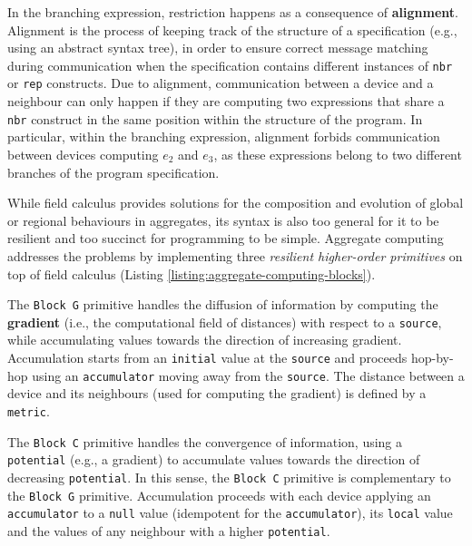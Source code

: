 \begin{itemize}
        In the branching expression, restriction happens as a consequence of
        \textbf{alignment}. Alignment is the process of keeping track of the
        structure of a specification (e.g., using an abstract syntax tree), in
        order to ensure correct message matching during communication when the
        specification contains different instances of \texttt{nbr} or
        \texttt{rep} constructs. Due to alignment, communication between a
        device and a neighbour can only happen if they are computing two
        expressions that share a \texttt{nbr} construct in the same position
        within the structure of the program. In particular, within the
        branching expression, alignment forbids communication between devices
        computing $e_2$ and $e_3$, as these expressions belong to two different
        branches of the program specification.
\end{itemize}

While field calculus provides solutions for the composition and evolution of
global or regional behaviours in aggregates, its syntax is also too general for
it to be resilient and too succinct for programming to be simple. Aggregate
computing addresses the problems by implementing three \textit{resilient
higher-order primitives} on top of field calculus (Listing
\ref{listing:aggregate-computing-blocks}).



The \texttt{Block G} primitive \cite{CAS-AggregateComputingBlocks} handles the
diffusion of information by computing the \textbf{gradient} (i.e., the
computational field of distances) with respect to a \texttt{source}, while
accumulating values towards the direction of increasing gradient. Accumulation
starts from an \texttt{initial} value at the \texttt{source} and proceeds
hop-by-hop using an \texttt{accumulator} moving away from the \texttt{source}.
The distance between a device and its neighbours (used for computing the
gradient) is defined by a \texttt{metric}.

The \texttt{Block C} primitive handles the convergence of information, using a
\texttt{potent\-ial} (e.g., a gradient) to accumulate values towards the
direction of decreasing \texttt{potent\-ial}. In this sense, the \texttt{Block
C} primitive is complementary to the \texttt{Block G} primitive. Accumulation
proceeds with each device applying an \texttt{accumulator} to a \texttt{null}
value (idempotent for the \texttt{accumulator}), its \texttt{local} value and
the values of any neighbour with a higher \texttt{potential}.


